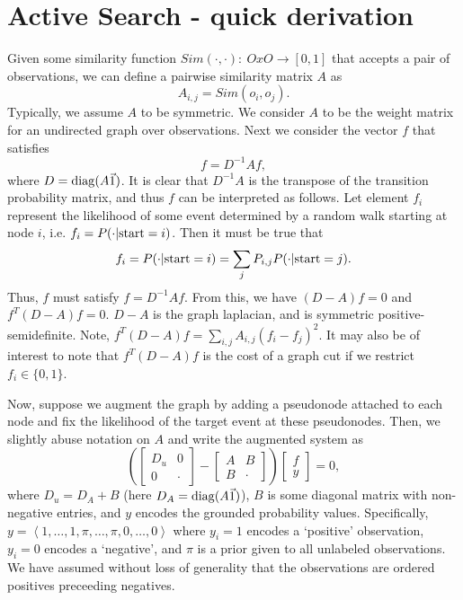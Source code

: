 \documentclass[12pt]{article}
\begin{document}

\section{Active Search - quick derivation}
Given some similarity function $Sim(\cdot,\cdot):~OxO\rightarrow [0,1]$ that accepts a pair of observations, we can define a pairwise similarity matrix $A$ as
\begin{equation}
   A_{i,j} = Sim(o_i,o_j).
\end{equation}
Typically, we assume $A$ to be symmetric. We consider $A$ to be the weight matrix for an undirected graph over observations. Next we consider the vector $f$ that satisfies
\begin{equation}
  f = D^{-1}Af,
\end{equation}
where $D = {\rm diag}(A\vec{1})$. It is clear that $D^{-1}A$ is the transpose of the transition probability matrix, and thus $f$ can be interpreted as follows. Let element $f_i$ represent the likelihood of some event determined by a random walk starting at node $i$, i.e. $f_i = P(\cdot|{\rm start}=i)$. Then it must be true that 
\begin{equation}
  f_i = P(\cdot|{\rm start}=i) = \sum_j P_{i,j} P(\cdot|{\rm start}=j).
\end{equation}
Thus, $f$ must satisfy $f = D^{-1}Af$. From this, we have $(D-A)f=0$ and $f^{T}(D-A)f=0$. $D-A$ is the graph laplacian, and is symmetric positive-semidefinite. Note, $f^{T}(D-A)f = \sum_{i,j} A_{i,j}(f_i-f_j)^2$. It may also be of interest to note that $f^{T}(D-A)f$ is the cost of a graph cut if we restrict $f_i \in \lbrace 0,1 \rbrace$.

Now, suppose we augment the graph by adding a pseudonode attached to each node and fix the likelihood of the target event at these pseudonodes. Then, we slightly abuse notation on $A$ and write the augmented system as
\begin{equation}
 \left(\left[ \begin{array}{cc} D_u & 0\\ 0 & \cdot \end{array} \right] - \left[ \begin{array}{cc} A & B \\ B & \cdot \end{array}\right]\right)\left[ \begin{array}{c} f \\ y \end{array}\right] = 0, \label{aug}
\end{equation}
where $D_u = D_A+B$ (here $D_A={\rm diag}(A\vec{1})$), $B$ is some diagonal matrix with non-negative entries, and $y$ encodes the grounded probability values. Specifically, $y=\left<1,\dots,1,\pi,\dots,\pi,0,\dots,0\right>$ where $y_i=1$ encodes a `positive' observation, $y_i=0$ encodes a `negative', and $\pi$ is a prior given to all unlabeled observations. We have assumed without loss of generality that the observations are ordered positives preceeding negatives.
\end{document}
